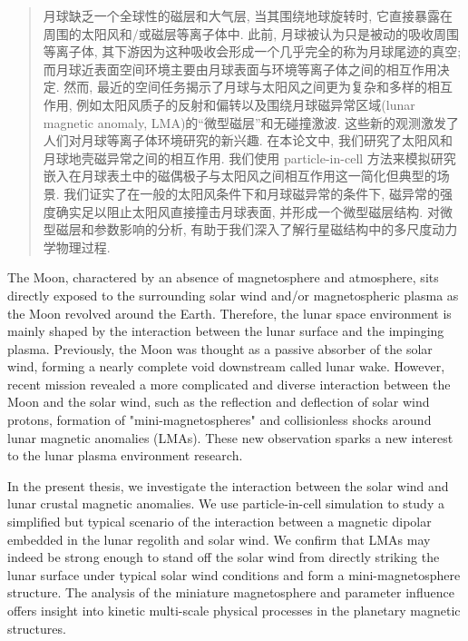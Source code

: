 

\begin{abstract}
  月球缺乏一个全球性的磁层和大气层, 当其围绕地球旋转时, 它直接暴露在周围的太阳风和/或磁层等离子体中. 此前, 月球被认为只是被动的吸收周围等离子体, 其下游因为这种吸收会形成一个几乎完全的称为月球尾迹的真空; 而月球近表面空间环境主要由月球表面与环境等离子体之间的相互作用决定. 然而, 最近的空间任务揭示了月球与太阳风之间更为复杂和多样的相互作用, 例如太阳风质子的反射和偏转以及围绕月球磁异常区域(lunar magnetic anomaly, LMA)的“微型磁层”和无碰撞激波. 这些新的观测激发了人们对月球等离子体环境研究的新兴趣. 在本论文中, 我们研究了太阳风和月球地壳磁异常之间的相互作用. 我们使用 particle-in-cell 方法来模拟研究嵌入在月球表土中的磁偶极子与太阳风之间相互作用这一简化但典型的场景. 我们证实了在一般的太阳风条件下和月球磁异常的条件下, 磁异常的强度确实足以阻止太阳风直接撞击月球表面, 并形成一个微型磁层结构. 对微型磁层和参数影响的分析, 有助于我们深入了解行星磁结构中的多尺度动力学物理过程.

\end{abstract}

\begin{abstract*}
  The Moon, charactered by an absence of magnetosphere and atmosphere, sits directly exposed to the surrounding solar wind and/or magnetospheric plasma as the Moon revolved around the Earth. Therefore, the lunar space environment is mainly shaped by the interaction between the lunar surface and the impinging plasma. Previously, the Moon was thought as a passive absorber of the solar wind, forming a nearly complete void downstream called lunar wake. However, recent mission revealed a more complicated and diverse interaction between the Moon and the solar wind, such as the reflection and deflection of solar wind protons, formation of "mini-magnetospheres" and collisionless shocks around lunar magnetic anomalies (LMAs). These new observation sparks a new interest to the lunar plasma environment research.
  
  In the present thesis, we investigate the interaction between the solar wind and lunar crustal magnetic anomalies. We use particle-in-cell simulation to study a simplified but typical scenario of the interaction between a magnetic dipolar embedded in the lunar regolith and solar wind. We confirm that LMAs may indeed be strong enough to stand off the solar wind from directly striking the lunar surface under typical solar wind conditions and form a mini-magnetosphere structure. The analysis of the miniature magnetosphere and parameter influence offers insight into kinetic multi-scale physical processes in the planetary magnetic structures.
\end{abstract*}
